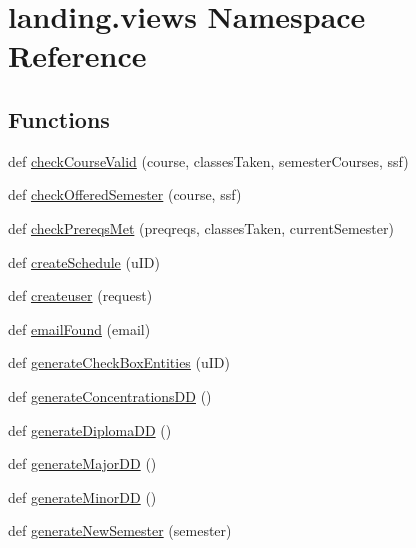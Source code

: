\hypertarget{namespacelanding_1_1views}{}\section{landing.\+views Namespace Reference}
\label{namespacelanding_1_1views}
\subsection*{Functions}
\begin{DoxyCompactItemize}
\item 
def \mbox{\hyperlink{namespacelanding_1_1views_adba23e76d333670361090c476505a965}{check\+Course\+Valid}} (course, classes\+Taken, semester\+Courses, ssf)
\item 
def \mbox{\hyperlink{namespacelanding_1_1views_a2f54a8ff8d9bcec3589d12b6e7fb9b73}{check\+Offered\+Semester}} (course, ssf)
\item 
def \mbox{\hyperlink{namespacelanding_1_1views_aebd6e45208c4d8a81796c95fa03c029a}{check\+Prereqs\+Met}} (preqreqs, classes\+Taken, current\+Semester)
\item 
def \mbox{\hyperlink{namespacelanding_1_1views_aa4736d3c8ed65938a640bd054c1fb588}{create\+Schedule}} (u\+ID)
\item 
def \mbox{\hyperlink{namespacelanding_1_1views_acd4507dea8fb635a81455db7918ee43c}{createuser}} (request)
\item 
def \mbox{\hyperlink{namespacelanding_1_1views_a54774f163c70feb2df73511f76bfd877}{email\+Found}} (email)
\item 
def \mbox{\hyperlink{namespacelanding_1_1views_a0d4c1e9d73373e8f2956340085eb50b2}{generate\+Check\+Box\+Entities}} (u\+ID)
\item 
def \mbox{\hyperlink{namespacelanding_1_1views_a3c3b157bf08697962286a0b17eff2d59}{generate\+Concentrations\+DD}} ()
\item 
def \mbox{\hyperlink{namespacelanding_1_1views_a30457ad7655375a7be248dc4b36d2194}{generate\+Diploma\+DD}} ()
\item 
def \mbox{\hyperlink{namespacelanding_1_1views_acee7a550e05650013c2b9205bf9a2a88}{generate\+Major\+DD}} ()
\item 
def \mbox{\hyperlink{namespacelanding_1_1views_ab124c7ee183d054b2316ae213be19b21}{generate\+Minor\+DD}} ()
\item 
def \mbox{\hyperlink{namespacelanding_1_1views_a219fcf8f07fa2eeaf2f31ad6d7fc6905}{generate\+New\+Semester}} (semester)
\item 

\end{DoxyCompactItemize}
